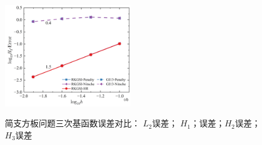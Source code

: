 \begin{figure}[H]
\begin{subcaptiongroup}
    \label{CH2}
    \includegraphics[width=0.49\textwidth]{figure/PHR/R/CH3.png}
    \label{CH3}
    \end{subcaptiongroup}
\caption{简支方板问题三次基函数误差对比： $L_2$误差； $H_1$；误差；$H_2$误差； $H_3$误差}
\label{RCLH}
\end{figure}
